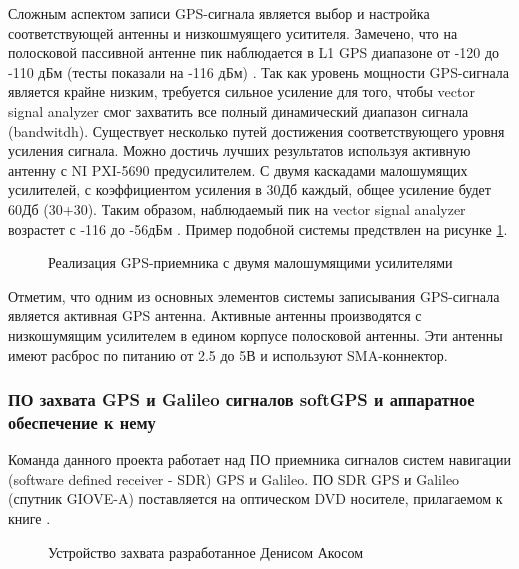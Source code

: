 Сложным аспектом записи GPS-сигнала является выбор и настройка соответствующей антенны и низкошмуящего уситителя.
Замечено, что на полосковой пассивной антенне пик наблюдается в L1 GPS диапазоне от -120 до -110 дБм
(тесты показали на -116 дБм) \cite{ni_article}. Так как уровень
мощности GPS-сигнала является крайне низким, требуется сильное усиление для того, чтобы vector signal
analyzer смог захватить все полный динамический диапазон сигнала (bandwitdh). Существует несколько путей достижения
соответствующего уровня усиления сигнала. Можно достичь лучших результатов используя активную антенну с NI PXI-5690
предусилителем. С двумя каскадами малошумящих усилителей, с коэффициентом усиления в 30Дб каждый, общее усиление будет
60Дб (30+30). Таким образом, наблюдаемый пик на vector signal analyzer возрастет с -116 до -56дБм \cite{ni_article}.
Пример подобной системы предствлен на рисунке \ref{pic:ni_gps_receiver}.

\begin{figure}[H]
\begin{center}
\end{center}
\caption{Реализация GPS-приемника с двумя малошумящими усилителями}
\label{pic:ni_gps_receiver}
\end{figure}

Отметим, что одним из основных элементов системы записывания GPS-сигнала является активная GPS антенна. Активные антенны
производятся с низкошумящим усилителем в едином корпусе полосковой антенны. Эти антенны имеют расброс по питанию от 2.5 до
5В и используют SMA-коннектор. 

\subsubsection{ПО захвата GPS и Galileo сигналов softGPS и аппаратное обеспечение к нему}
Команда данного проекта работает над ПО приемника сигналов систем навигации (software defined receiver - SDR) GPS и Galileo. ПО SDR
GPS и Galileo (спутник GIOVE-A) поставляется на оптическом DVD носителе, прилагаемом к книге \cite{gps}.

\begin{figure}[H]
\begin{center}
\end{center}
\caption{Устройство захвата разработанное Денисом Акосом}
\label{pic:softGPS}
\end{figure}

